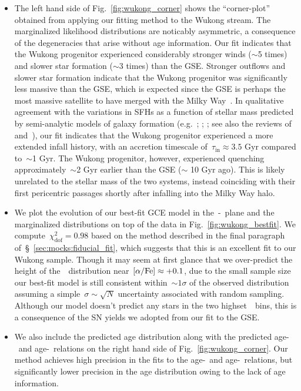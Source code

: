 \documentclass[ms.tex]{subfiles}
\begin{document}
\begin{itemize}
	\item The left hand side of Fig.~\ref{fig:wukong_corner} shows the
	``corner-plot'' obtained from applying our fitting method to the Wukong
	stream.
	The marginalized likelihood distributions are noticably asymmetric, a
	consequence of the degeneracies that arise without age information.
	Our fit indicates that the Wukong progenitor experienced considerably
	stronger winds ($\sim$5 times) and slower star formation ($\sim$3 times)
	than the GSE.
	Stronger outflows and slower star formation indicate that the Wukong
	progenitor was significantly less massive than the GSE, which is expected
	since the GSE is perhaps the most massive satellite to have merged with
	the Milky Way~\citep{Deason2019, Fattahi2019, Mackereth2019, Vincenzo2019}.
	In qualitative agreement with the variations in SFHs as a function of
	stellar mass predicted by semi-analytic models of galaxy formation
	(e.g.~\citealp{Baugh2005, Bower2006, Benson2012};
	\citealp*{Somerville2015b}; \citealp{Croton2016, Behroozi2019}; see also
	the reviews of \citealt{Baugh2006} and~\citealt{Somerville2015a}), our fit
	indicates that the Wukong progenitor experienced a more extended infall
	history, with an accretion timescale of~$\tau_\text{in} \approx 3.5$ Gyr
	compared to~$\sim$1 Gyr.
	The Wukong progenitor, however, experienced quenching approximately~$\sim$2
	Gyr earlier than the GSE ($\sim$ 10 Gyr ago).
	This is likely unrelated to the stellar mass of the two systems, instead
	coinciding with their first pericentric passages shortly after infalling
	into the Milky Way halo.

	\item We plot the evolution of our best-fit GCE model in the~\afe-\feh~plane
	and the marginalized distributions on top of the data in
	Fig.~\ref{fig:wukong_bestfit}.
	We compute~$\chi_\text{dof}^2 = 0.98$ based on the method described in the
	final paragraph of~\S~\ref{sec:mocks:fiducial_fit}, which suggests that
	this is an excellent fit to our Wukong sample.
	Though it may seem at first glance that we over-predict the height of
	the~\afe~distribution near~$\text{[$\alpha$/Fe]} \approx +0.1$, due to the small sample
	size our best-fit model is still consistent within~$\sim1\sigma$ of the
	observed distribution assuming a simple~$\sigma\sim\sqrt{N}$ uncertainty
	associated with random sampling.
	Although our model doesn't predict any stars in the two highset~\afe~bins,
	this is a consequence of the SN yields we adopted from our fit to the GSE.
	
	\item We also include the predicted age distribution along with the
	predicted age-\feh~and age-\afe~relations on the right hand side of
	Fig.~\ref{fig:wukong_corner}.
	Our method achieves high precision in the fits to the age-\feh~and
	age-\afe~relations, but significantly lower precision in the age
	distribution owing to the lack of age information.

\end{itemize}
\end{document}
